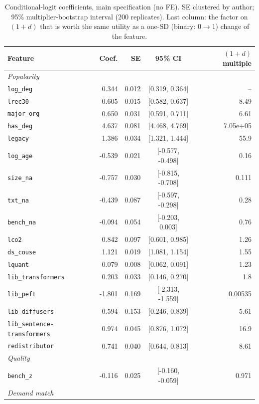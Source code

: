\begin{table}[htbp]
\centering
\caption{Conditional-logit coefficients, main specification (no FE). SE clustered by author; 95\% multiplier-bootstrap interval (200 replicates). Last column: the factor on $(1+d)$ that is worth the same utility as a one-SD (binary: 0$\to$1) change of the feature.}
\label{tab:coef}
\scriptsize
\begin{tabular}{lrrcr}
\toprule
Feature & Coef. & SE & 95\% CI & $(1{+}d)$ multiple \\
\midrule
\multicolumn{5}{l}{\textit{Popularity}} \\
\texttt{log\_deg} & 0.344 & 0.012 & [0.319, 0.364] & -- \\
\texttt{lrec30} & 0.605 & 0.015 & [0.582, 0.637] & 8.49 \\
\texttt{major\_org} & 0.650 & 0.031 & [0.591, 0.711] & 6.61 \\
\texttt{has\_deg} & 4.637 & 0.081 & [4.468, 4.769] & 7.05e+05 \\
\texttt{legacy} & 1.386 & 0.034 & [1.321, 1.444] & 55.9 \\
\texttt{log\_age} & -0.539 & 0.021 & [-0.577, -0.498] & 0.16 \\
\texttt{size\_na} & -0.757 & 0.030 & [-0.815, -0.708] & 0.111 \\
\texttt{txt\_na} & -0.439 & 0.087 & [-0.597, -0.298] & 0.28 \\
\texttt{bench\_na} & -0.094 & 0.054 & [-0.203, 0.003] & 0.76 \\
\texttt{lco2} & 0.842 & 0.097 & [0.601, 0.985] & 1.26 \\
\texttt{ds\_couse} & 1.121 & 0.019 & [1.081, 1.154] & 1.55 \\
\texttt{lquant} & 0.079 & 0.008 & [0.062, 0.091] & 1.23 \\
\texttt{lib\_transformers} & 0.203 & 0.033 & [0.146, 0.270] & 1.8 \\
\texttt{lib\_peft} & -1.801 & 0.169 & [-2.313, -1.559] & 0.00535 \\
\texttt{lib\_diffusers} & 0.594 & 0.153 & [0.246, 0.839] & 5.61 \\
\texttt{lib\_sentence-transformers} & 0.974 & 0.045 & [0.876, 1.072] & 16.9 \\
\texttt{redistributor} & 0.741 & 0.040 & [0.644, 0.813] & 8.61 \\
\midrule
\multicolumn{5}{l}{\textit{Quality}} \\
\texttt{bench\_z} & -0.116 & 0.025 & [-0.160, -0.059] & 0.971 \\
\midrule
\multicolumn{5}{l}{\textit{Demand match}} \\

\end{tabular}
\end{table}
